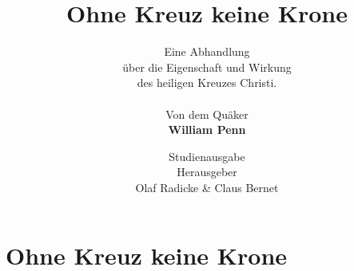 \documentclass[pdftex,pagesize, 10pt]{scrbook}
\begin{document}
\thispagestyle{empty}

\null\newpage
\thispagestyle{empty}

\author{
Eine Abhandlung \\
über die Eigenschaft und Wirkung \\
des heiligen Kreuzes Christi.
\\
\\
Von dem Quäker
\\
\textbf{William Penn}
}

\title{Ohne Kreuz keine Krone}
\date{
\vspace{3cm}
Studienausgabe\\
\vfill
Herausgeber \\
Olaf Radicke \& Claus Bernet
}

\maketitle

\frontmatter

\tableofcontents



\mainmatter

 


\setcounter{secnumdepth}{-2}
\part{Ohne Kreuz keine Krone}

\end{document}
